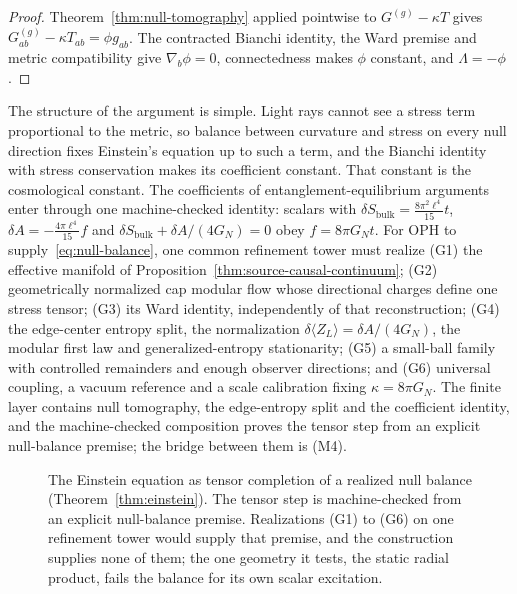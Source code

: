 \documentclass[11pt]{article}
\theoremstyle{definition}
\theoremstyle{remark}
\begin{document}
\begin{proof}
Theorem~\ref{thm:null-tomography} applied pointwise to $G^{(g)}-\kappa T$
gives $G^{(g)}_{ab}-\kappa T_{ab}=\phi g_{ab}$. The contracted Bianchi
identity, the Ward premise and metric compatibility give $\nabla_b\phi=0$,
connectedness makes $\phi$ constant, and $\Lambda=-\phi$.
\end{proof}

The structure of the argument is simple. Light rays cannot see a stress
term proportional to the metric, so balance between curvature and stress on
every null direction fixes Einstein's equation up to such a term, and the
Bianchi identity with stress conservation makes its coefficient constant.
That constant is the cosmological constant. The coefficients of
entanglement-equilibrium arguments \cite{jacobson16} enter through one
machine-checked identity: scalars with
$\delta S_{\mathrm{bulk}}=\tfrac{8\pi^2\ell^4}{15}t$,
$\delta A=-\tfrac{4\pi\ell^4}{15}f$ and
$\delta S_{\mathrm{bulk}}+\delta A/(4G_N)=0$ obey $f=8\pi G_Nt$. For OPH to
supply~\eqref{eq:null-balance}, one common refinement tower must realize
(G1) the effective manifold of Proposition~\ref{thm:source-causal-continuum};
(G2) geometrically normalized cap modular flow whose directional charges
define one stress tensor; (G3) its Ward identity, independently of that
reconstruction; (G4) the edge-center entropy split, the normalization
$\delta\langle Z_L\rangle=\delta A/(4G_N)$, the modular first law and
generalized-entropy stationarity; (G5) a small-ball family with controlled
remainders and enough observer directions; and (G6) universal coupling, a
vacuum reference and a scale calibration fixing $\kappa=8\pi G_N$. The finite
layer contains null tomography, the edge-entropy split and the coefficient
identity, and the machine-checked composition proves the tensor step from an
explicit null-balance premise; the bridge between them is (M4).

\begin{figure}[!htb]
\centering

\caption{The Einstein equation as tensor completion of a realized null balance (Theorem~\ref{thm:einstein}). The tensor step is machine-checked from an explicit null-balance premise. Realizations (G1) to (G6) on one refinement tower would supply that premise, and the construction supplies none of them; the one geometry it tests, the static radial product, fails the balance for its own scalar excitation.}
\label{fig:einstein-chain}
\end{figure}
\end{document}
